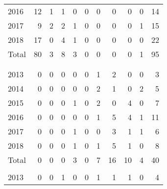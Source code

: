 \documentclass[a4paper]{article}
\begin{document}
\begin{table}
{\begin{tabular}[t]{lrrrrrrrrrr}
\hspace{1em}\hspace{1em}2016 & 12 & 1 & 1 & 0 & 0 & 0 & 0 & 0 & 0 & 14\\
\hspace{1em}\hspace{1em}2017 & 9 & 2 & 2 & 1 & 0 & 0 & 0 & 0 & 1 & 15\\
\hspace{1em}\hspace{1em}2018 & 17 & 0 & 4 & 1 & 0 & 0 & 0 & 0 & 0 & 22\\
\hspace{1em}\hspace{1em}Total & 80 & 3 & 8 & 3 & 0 & 0 & 0 & 0 & 1 & 95\\
\addlinespace[0.3em]
\multicolumn{11}{l}{\textbf{Withdrawal}}\\
\addlinespace[0.3em]
\multicolumn{11}{l}{\textbf{Extern}}\\
\hspace{1em}\hspace{1em}2013 & 0 & 0 & 0 & 0 & 0 & 1 & 2 & 0 & 0 & 3\\
\hspace{1em}\hspace{1em}2014 & 0 & 0 & 0 & 0 & 0 & 2 & 1 & 0 & 2 & 5\\
\hspace{1em}\hspace{1em}2015 & 0 & 0 & 0 & 1 & 0 & 2 & 0 & 4 & 0 & 7\\
\hspace{1em}\hspace{1em}2016 & 0 & 0 & 0 & 0 & 0 & 1 & 5 & 4 & 1 & 11\\
\hspace{1em}\hspace{1em}2017 & 0 & 0 & 0 & 1 & 0 & 0 & 3 & 1 & 1 & 6\\
\hspace{1em}\hspace{1em}2018 & 0 & 0 & 0 & 1 & 0 & 1 & 5 & 1 & 0 & 8\\
\hspace{1em}\hspace{1em}Total & 0 & 0 & 0 & 3 & 0 & 7 & 16 & 10 & 4 & 40\\
\addlinespace[0.3em]
\multicolumn{11}{l}{\textbf{Intern}}\\
\hspace{1em}\hspace{1em}2013 & 0 & 0 & 1 & 0 & 0 & 1 & 1 & 1 & 0 & 4\\

\end{tabular}}
\end{table}
\end{document}

